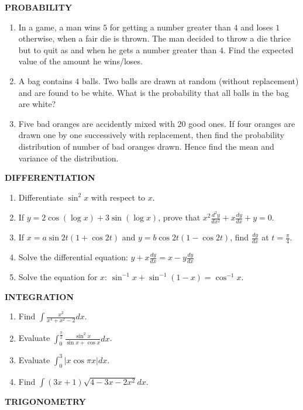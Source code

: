 \documentclass[12pt,-letter paper]{article}
\begin{document}
\begin{center}
	\textbf{PROBABILITY}
\end{center}
\begin{enumerate}
\item In a game, a man wins \rupee$5$ for getting a number greater than $4$ and loses \rupee$1$ otherwise, when a fair die is thrown. The man decided to throw a die thrice but to quit as and when he gets a number greater than $4$. Find the expected value of the amount he wins/loses. 
\item A bag contains $4$ balls. Two balls are drawn at random (without replacement) and are found to be white. What is the probability that all balls in the bag are white?
\item Five bad oranges are accidently mixed with $20$ good ones. If four oranges are drawn one by one successively with replacement, then find the probability distribution of number of bad oranges drawn. Hence find the mean and variance of the distribution.
\end{enumerate}
\begin{center}
	\textbf{DIFFERENTIATION}
\end{center}
\begin{enumerate}
\item Differentiate $\sin^2 x$ with respect to $x$. 
\item If $y=2\cos(\log x)+3\sin(\log x)$, prove that $x^2\frac{d^2y}{dx^2}+x\frac{dy}{dx}+y=0$. 
\item If $x=a\sin 2t(1+\cos 2t)$ and $y=b\cos 2t(1-\cos 2t)$, find $\frac{dy}{dx}$ at $t=\frac{\pi}{4}$.
\item Solve the differential equation: 
$y+x\frac{dy}{dx}=x-y\frac{dy}{dx}$
\item Solve the equation for $x$: $\sin^{-1}x+\sin^{-1}(1-x)=\cos^{-1}x$.
\end{enumerate}
\begin{center}
	\textbf{INTEGRATION}
\end{center}
\begin{enumerate}
\item Find $\int\frac{x^2}{x^4+x^2-2}dx$. 
\item Evaluate $\int_{0}^{\frac{\pi}{2}}\frac{\sin^2x}{\sin x+\cos x}dx$. 
\item Evaluate $\int_{0}^{3}|x\cos \pi x|dx$. 
\item Find $\int(3x+1)\sqrt{4-3x-2x^2}dx$.

\end{enumerate}
\begin{center}
	\textbf{TRIGONOMETRY}
\end{center}
\end{document}
